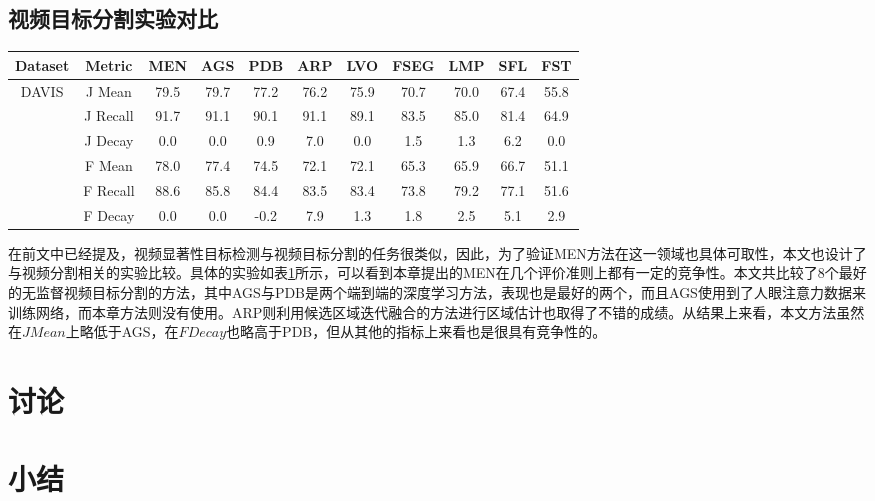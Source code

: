 \subsection{视频目标分割实验对比}
\begin{table}[]
\label{compare_all_seg}
\begin{tabular}{|c|c|ccccccccc}
\hline
Dataset & Metric & \multicolumn{1}{c|}{MEN} & \multicolumn{1}{c|}{AGS} & \multicolumn{1}{c|}{PDB} & \multicolumn{1}{c|}{ARP} & \multicolumn{1}{c|}{LVO} & \multicolumn{1}{c|}{FSEG} & \multicolumn{1}{c|}{LMP} & \multicolumn{1}{c|}{SFL} & \multicolumn{1}{c|}{FST} \\ \hline
\multirow{6}{*}{DAVIS} & J Mean & 79.5 & 79.7 & 77.2 & 76.2 & 75.9 & 70.7 & 70.0 & 67.4 & 55.8 \\
 & J Recall & 91.7 & 91.1 & 90.1 & 91.1 & 89.1 & 83.5 & 85.0 & 81.4 & 64.9 \\
 & J Decay & 0.0 & 0.0 & 0.9 & 7.0 & 0.0 & 1.5 & 1.3 & 6.2 & 0.0 \\ \cline{2-11} 
 & F Mean & 78.0 & 77.4 & 74.5 & 72.1 & 72.1 & 65.3 & 65.9 & 66.7 & 51.1 \\
 & F Recall & 88.6 & 85.8 & 84.4 & 83.5 & 83.4 & 73.8 & 79.2 & 77.1 & 51.6 \\
 & F Decay & 0.0 & 0.0 & -0.2 & 7.9 & 1.3 & 1.8 & 2.5 & 5.1 & 2.9 \\ \hline
\end{tabular}
\end{table}
在前文中已经提及，视频显著性目标检测与视频目标分割的任务很类似，因此，为了验证MEN方法在这一领域也具体可取性，本文也设计了与视频分割相关的实验比较。具体的实验如表\ref{compare_all_seg}所示，可以看到本章提出的MEN在几个评价准则上都有一定的竞争性。本文共比较了8个最好的无监督视频目标分割的方法，其中AGS与PDB是两个端到端的深度学习方法，表现也是最好的两个，而且AGS使用到了人眼注意力数据来训练网络，而本章方法则没有使用。ARP则利用候选区域迭代融合的方法进行区域估计也取得了不错的成绩。从结果上来看，本文方法虽然在$J Mean$上略低于AGS，在$F Decay$也略高于PDB，但从其他的指标上来看也是很具有竞争性的。

\section{讨论}
\Blindtext

\section{小结}
\Blindtext 